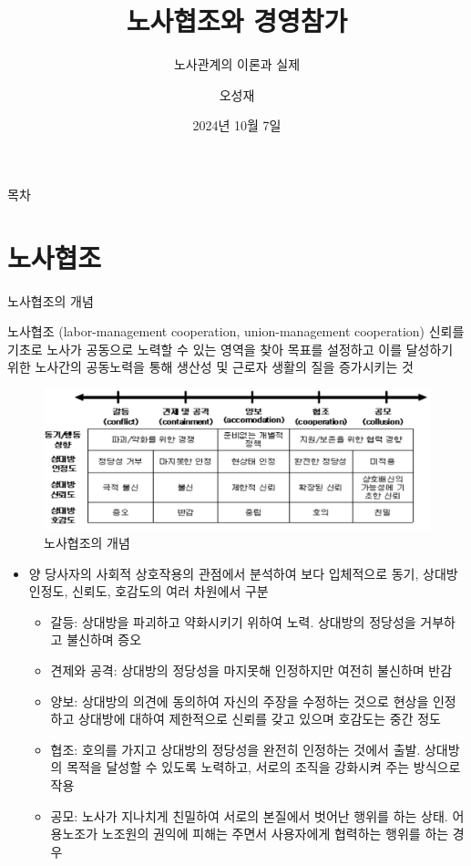 \documentclass[aspectratio=169,xcolor=dvipsnames,handout]{beamer}
\title{노사협조와 경영참가}
\subtitle{노사관계의 이론과 실제}
\author{오성재}
\institute[CNU]
{\relax
    충남대학교 경제학과\
    }
\date{2024년 10월 7일}
\begin{document}

\frame{\titlepage}

\begin{frame}{목차}
    \small
    \tableofcontents[hideallsubsections]
\end{frame}

\section{노사협조}


\begin{frame}[allowframebreaks]{노사협조의 개념}
    \begin{block}{노사협조 (labor-management cooperation, union-management cooperation)}
        신뢰를 기초로 노사가 공동으로 노력할 수 있는 영역을 찾아 목표를 설정하고 이를 달성하기 위한 노사간의 공동노력을 통해 생산성 및 근로자 생활의 질을 증가시키는 것
    \end{block}
    \framebreak\relax
    \centering
    \begin{figure}
        \includegraphics[width=.8\textwidth]{pic/노사협조개념도.png}
        \caption{노사협조의 개념}
    \end{figure}
    \begin{itemize}[<+->]
        \item 양 당사자의 사회적 상호작용의 관점에서 분석하여 보다 입체적으로 동기, 상대방 인정도, 신뢰도, 호감도의 여러 차원에서 구분
        \begin{itemize}[<+->]
            \item 갈등: 상대방을 파괴하고 약화시키기 위하여 노력. 상대방의 정당성을 거부하고 불신하며 증오
            \item 견제와 공격: 상대방의 정당성을 마지못해 인정하지만 여전히 불신하며 반감
            \item 양보: 상대방의 의견에 동의하여 자신의 주장을 수정하는 것으로 현상을 인정하고 상대방에 대하여 제한적으로 신뢰를 갖고 있으며 호감도는 중간 정도
            \item 협조: 호의를 가지고 상대방의 정당성을 완전히 인정하는 것에서 출발. 상대방의 목적을 달성할 수 있도록 노력하고, 서로의 조직을 강화시켜 주는 방식으로 작용
            \item 공모: 노사가 지나치게 친밀하여 서로의 본질에서 벗어난 행위를 하는 상태. 어용노조가 노조원의 권익에 피해는 주면서 사용자에게 협력하는 행위를 하는 경우
        \end{itemize}
    \end{itemize}
\end{frame}
\end{document}
